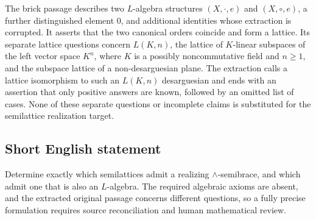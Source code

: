\documentclass[11pt]{article}
\begin{document}
The brick passage describes two \(L\)-algebra structures \((X,\cdot,e)\) and \((X,\circ,e)\), a further distinguished element \(0\), and additional identities whose extraction is corrupted. It asserts that the two canonical orders coincide and form a lattice. Its separate lattice questions concern \(L(K,n)\), the lattice of \(K\)-linear subspaces of the left vector space \(K^n\), where \(K\) is a possibly noncommutative field and \(n\geq1\), and the subspace lattice of a non-desarguesian plane. The extraction calls a lattice isomorphism to such an \(L(K,n)\) desarguesian and ends with an assertion that only positive answers are known, followed by an omitted list of cases. None of these separate questions or incomplete claims is substituted for the semilattice realization target.
\subsection{Short English statement}
Determine exactly which semilattices admit a realizing \(\wedge\)-semibrace, and which admit one that is also an \(L\)-algebra. The required algebraic axioms are absent, and the extracted original passage concerns different questions, so a fully precise formulation requires source reconciliation and human mathematical review.
\end{document}
